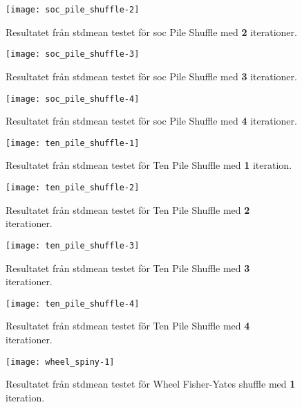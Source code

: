 \begin{figure}[H]
	\centering
	\texttt{[image: soc\_pile\_shuffle-2]} 
	\captionsetup{width=0.5\textwidth}
	\caption{Resultatet från \gls{stdmean} testet för \gls{soc} Pile
	Shuffle med \textbf{2} iterationer.}
	\label{fig:soc-2}
\end{figure}

\begin{figure}[H]
	\centering
	\texttt{[image: soc\_pile\_shuffle-3]} 
	\captionsetup{width=0.5\textwidth}
	\caption{Resultatet från \gls{stdmean} testet för \gls{soc} Pile
	Shuffle med \textbf{3} iterationer.}
	\label{fig:soc-3}
\end{figure}

\begin{figure}[H]
	\centering
	\texttt{[image: soc\_pile\_shuffle-4]} 
	\captionsetup{width=0.5\textwidth}
	\caption{Resultatet från \gls{stdmean} testet för \gls{soc} Pile
	Shuffle med \textbf{4} iterationer.}
	\label{fig:soc-4}
\end{figure}

\begin{figure}[H]
	\centering
	\texttt{[image: ten\_pile\_shuffle-1]} 
	\captionsetup{width=0.5\textwidth}
	\caption{Resultatet från \gls{stdmean} testet för Ten Pile
	Shuffle med \textbf{1} iteration.}
	\label{fig:ten-1}
\end{figure}

\begin{figure}[H]
	\centering
	\texttt{[image: ten\_pile\_shuffle-2]} 
	\captionsetup{width=0.5\textwidth}
	\caption{Resultatet från \gls{stdmean} testet för Ten Pile
	Shuffle med \textbf{2} iterationer.}
	\label{fig:ten-2}
\end{figure}

\begin{figure}[H]
	\centering
	\texttt{[image: ten\_pile\_shuffle-3]} 
	\captionsetup{width=0.5\textwidth}
	\caption{Resultatet från \gls{stdmean} testet för Ten Pile
	Shuffle med \textbf{3} iterationer.}
	\label{fig:ten-3}
\end{figure}

\begin{figure}[H]
	\centering
	\texttt{[image: ten\_pile\_shuffle-4]} 
	\captionsetup{width=0.5\textwidth}
	\caption{Resultatet från \gls{stdmean} testet för Ten Pile
	Shuffle med \textbf{4} iterationer.}
	\label{fig:ten-4}
\end{figure}

\begin{figure}[H]
	\centering
	\texttt{[image: wheel\_spiny-1]} 
	\captionsetup{width=0.5\textwidth}
	\caption{Resultatet från \gls{stdmean} testet för Wheel Fisher-Yates shuffle med \textbf{1} iteration.}
	\label{fig:wheel-1}
\end{figure}

